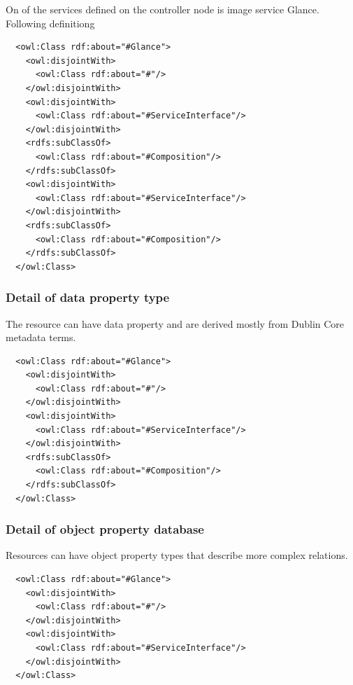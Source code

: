 On of the services defined on the controller node is image service Glance. Following definitiong


\begin{lstlisting}
  <owl:Class rdf:about="#Glance">
    <owl:disjointWith>
      <owl:Class rdf:about="#"/>
    </owl:disjointWith>
    <owl:disjointWith>
      <owl:Class rdf:about="#ServiceInterface"/>
    </owl:disjointWith>
    <rdfs:subClassOf>
      <owl:Class rdf:about="#Composition"/>
    </rdfs:subClassOf>
    <owl:disjointWith>
      <owl:Class rdf:about="#ServiceInterface"/>
    </owl:disjointWith>
    <rdfs:subClassOf>
      <owl:Class rdf:about="#Composition"/>
    </rdfs:subClassOf>
  </owl:Class>
\end{lstlisting}

\subsubsection{Detail of data property type}

The resource can have data property and are derived mostly from Dublin Core metadata terms.

\begin{lstlisting}
  <owl:Class rdf:about="#Glance">
    <owl:disjointWith>
      <owl:Class rdf:about="#"/>
    </owl:disjointWith>
    <owl:disjointWith>
      <owl:Class rdf:about="#ServiceInterface"/>
    </owl:disjointWith>
    <rdfs:subClassOf>
      <owl:Class rdf:about="#Composition"/>
    </rdfs:subClassOf>
  </owl:Class>
\end{lstlisting}

\subsubsection{Detail of object property database}

Resources can have object property types that describe more complex relations. 

\begin{lstlisting}
  <owl:Class rdf:about="#Glance">
    <owl:disjointWith>
      <owl:Class rdf:about="#"/>
    </owl:disjointWith>
    <owl:disjointWith>
      <owl:Class rdf:about="#ServiceInterface"/>
    </owl:disjointWith>
  </owl:Class>
\end{lstlisting}
